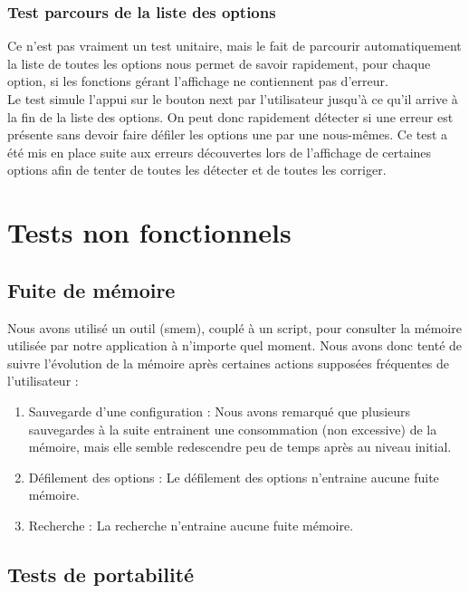 \documentclass[16pts]{report}
\begin{document}
\subsubsection{Test parcours de la liste des options}

Ce n'est pas vraiment un test unitaire, mais le fait de parcourir
automatiquement la liste de toutes les options nous permet de savoir
rapidement, pour chaque option, si les fonctions gérant l'affichage ne
contiennent pas d'erreur. \\

Le test simule l'appui sur le bouton next par l'utilisateur jusqu'à ce qu'il
arrive à la fin de la liste des options. On peut donc rapidement détecter si
une erreur est présente sans devoir faire défiler les options une par une
nous-mêmes. Ce test a été mis en place suite aux erreurs découvertes lors de
l'affichage de certaines options afin de tenter de toutes les détecter et de
toutes les corriger.

    \section{Tests non fonctionnels}
    \label{sec:Tests non fonctionnels}
\subsection{Fuite de mémoire}
\label{sub:Fuite de mémoire}

Nous avons utilisé un outil (smem), couplé à un script, pour consulter la
mémoire utilisée par notre application à n'importe quel moment. Nous avons donc
tenté de suivre l'évolution de la mémoire après certaines actions supposées
fréquentes de l'utilisateur :

\begin{enumerate}
    \item Sauvegarde d'une configuration : Nous avons remarqué que plusieurs
        sauvegardes à la suite entrainent une consommation (non excessive) de
        la mémoire, mais elle semble redescendre peu de temps après au niveau
        initial.
    \item Défilement des options : Le défilement des options n'entraine
          aucune fuite mémoire.
    \item Recherche : La recherche n'entraine aucune fuite mémoire.
\end{enumerate}


\subsection{Tests de portabilité}
\end{document}
